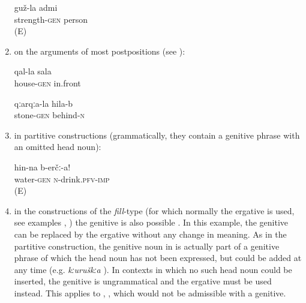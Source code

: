 \begin{enumerate}
\begin{exe}
		\ex	\label{ex:strong person}
		\gll	guž-la	admi\\
			strength-\textsc{gen}	person\\
		\glt	{} (E)

	\end{exe}

	\item	on the arguments of most postpositions (see ):
	\begin{exe}
		\ex	\label{ex:in front of the house}
		\gll	qal-la sala\\
			house-\textsc{gen}	in.front\\
		\glt	{}

		\ex	\label{ex:behind the stone}
		\gll	qːarqːa-la	hila-b\\
			stone-\textsc{gen}	behind-\textsc{n}\\
		\glt	{}
	\end{exe}

	\item	in partitive constructions (grammatically, they contain a genitive phrase with an omitted head noun):
	\begin{exe}
		\ex	\label{ex:Drink (some) water}
		\gll	hin-na	b-erčː-a!\\
			water-\textsc{gen}	\textsc{n}-drink.\textsc{pfv}-\textsc{imp}\\
		\glt	\sqt{Drink (some) water!} (E)
	\end{exe}

\item	in the constructions of the \textit{fill}-type (for which normally the ergative is used, see examples , ) the genitive is also possible . In this example, the genitive can be replaced by the ergative without any change in meaning. As in the partitive construction, the genitive noun in  is actually part of a genitive phrase of which the head noun has not been expressed, but could be added at any time (e.g. \textit{kːuruškːa} ). In contexts in which no such head noun could be inserted, the genitive is ungrammatical and the ergative must be used instead. This applies to , , which would not be admissible with a genitive.


\end{enumerate}
